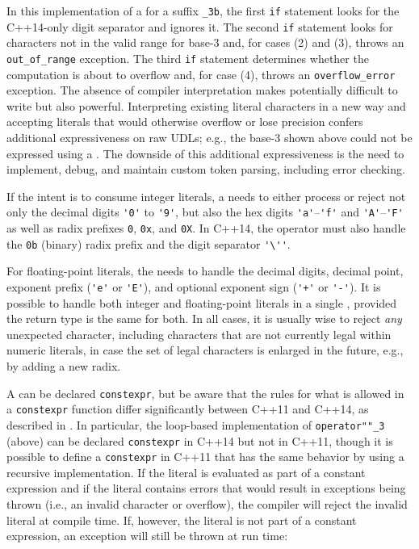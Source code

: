 \noindent In this implementation of a  for a suffix
\lstinline!_3b!, the first \lstinline!if! statement looks for the C++14-only digit separator and ignores it. The second \lstinline!if! statement
looks for characters not in the valid range for base-3 and, for cases (2) and (3), throws
an \lstinline!out_of_range! exception. The third
\lstinline!if! statement determines whether the computation is about to
overflow and, for case (4), throws an \lstinline!overflow_error! exception.
The absence of compiler interpretation makes 
potentially difficult to write but also powerful. Interpreting
existing literal characters in a new way and accepting literals that
would otherwise overflow or lose precision confers additional expressiveness on raw UDLs; e.g., the base-3  shown above could
not be expressed using a . The downside of this additional expressiveness is the need to implement, debug, and maintain custom token parsing, including error checking.

If the intent is to consume integer literals, a  needs to  either process or reject not only the
decimal digits \lstinline!'0'! to \lstinline!'9'!, but also the hex digits
\lstinline!'a'!--\lstinline!'f'! and \lstinline!'A'!--\lstinline!'F'! as well as
radix prefixes \lstinline!0!, \lstinline!0x!, and \lstinline!0X!. In C++14, the operator
must also handle the \lstinline!0b! (binary) radix prefix and the digit
separator \lstinline!'\''!.

For floating-point literals, the  needs to
handle the decimal digits, decimal point, exponent prefix (\lstinline!'e'!
or \lstinline!'E'!), and optional exponent sign (\lstinline!'+'! or
\lstinline!'-'!). It is possible to handle both integer and floating-point
literals in a single , provided the return type
is the same for both. In all cases, it is usually wise to reject
\emph{any} unexpected character, including characters that are not
currently legal within numeric literals, in case the set of legal
characters is enlarged in the future, e.g., by adding a new radix.

A  can be declared \lstinline!constexpr!, but be
aware that the rules for what is allowed in a \lstinline!constexpr!
function differ significantly between C++11 and C++14, as described in . In particular, the
loop-based implementation of \lstinline!operator""_3! (above) can be
declared \lstinline!constexpr! in C++14 but not in C++11, though it is
possible to define a \lstinline!constexpr!  in C++11
that has the same behavior by using a recursive implementation. If the
literal is evaluated as part of a constant expression and if the literal
contains errors that would result in exceptions being thrown (i.e., an
invalid character or overflow), the compiler will reject the invalid
literal at compile time. If, however, the literal is not part of a
constant expression, an exception will still be thrown at run time:

